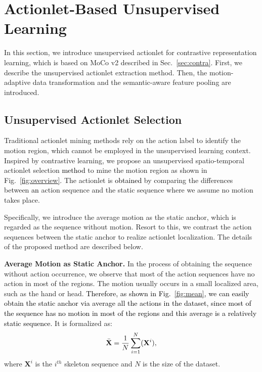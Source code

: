 \documentclass[twocolumn]{article}
\newcommand{\wh}[1]{\textcolor{black}{#1}}
\begin{document}
\section{Actionlet-Based Unsupervised Learning}
In this section, we introduce unsupervised actionlet for contrastive representation learning, which is based on MoCo v2 described in Sec.~\ref{sec:contra}.
First, we describe the unsupervised actionlet extraction method. Then, the motion-adaptive data transformation and the semantic-aware feature pooling are introduced.





















\subsection{Unsupervised Actionlet Selection}
\label{sec:actionlet}
Traditional actionlet mining methods rely on the action label to identify the motion region, which cannot be employed in the unsupervised learning context.
Inspired by contrastive learning, we propose an unsupervised spatio-temporal actionlet selection \wh{method} to mine the motion region as shown in Fig.~\ref{fig:overview}.
The actionlet is \wh{obtained} by comparing the differences between \wh{an} action sequence and the static sequence where we assume no motion takes place.

Specifically, we introduce the average motion as the static anchor, which is regarded as the sequence without motion. Resort to this, we contrast the action sequences between the static anchor to realize actionlet localization. The details of the proposed method are described below.
\vspace{1mm}

\noindent\textbf{Average Motion as Static Anchor.}
In the process of obtaining the sequence without action occurrence, we observe that most of the action sequences have no action in most of the regions. The motion usually occurs in a small localized area, such as the hand or head.
\wh{Therefore, as shown in Fig.~\ref{fig:mean}, we can easily obtain the static anchor via average all the actions in the dataset, since most of the sequence has no motion in most of the regions and this average is a relatively static sequence.} 
It is formalized as:
\begin{equation}
    \label{equ:info}
    \begin{aligned}
    \Bar{\mathbf{X}} = \frac{1}{N}\sum_{i=1}^N (\mathbf{X}^i),
    \end{aligned}
\end{equation}
where $\mathbf{X}^i$ is the $i^{th}$ skeleton sequence and $N$ is the size of the dataset.
\vspace{1mm}
\end{document}
